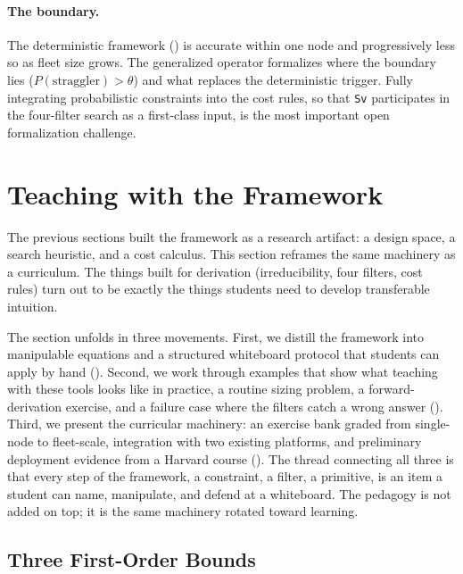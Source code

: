 \documentclass[10pt,twocolumn]{article}
\begin{document}
\paragraph{The boundary.} The deterministic framework () is accurate within one node and progressively less so as fleet size grows. The generalized operator formalizes where the boundary lies ($P(\text{straggler}) > \theta$) and what replaces the deterministic trigger. Fully integrating probabilistic constraints into the cost rules, so that \texttt{Sv} participates in the four-filter search as a first-class input, is the most important open formalization challenge.

\section{Teaching with the Framework}
\label{sec:teaching}

The previous sections built the framework as a research artifact: a design space, a search heuristic, and a cost calculus. This section reframes the same machinery as a curriculum. The things built for derivation (irreducibility, four filters, cost rules) turn out to be exactly the things students need to develop transferable intuition.

The section unfolds in three movements. First, we distill the framework into manipulable equations and a structured whiteboard protocol that students can apply by hand (). Second, we work through examples that show what teaching with these tools looks like in practice, a routine sizing problem, a forward-derivation exercise, and a failure case where the filters catch a wrong answer (). Third, we present the curricular machinery: an exercise bank graded from single-node to fleet-scale, integration with two existing platforms, and preliminary deployment evidence from a Harvard course (). The thread connecting all three is that every step of the framework, a constraint, a filter, a primitive, is an item a student can name, manipulate, and defend at a whiteboard. The pedagogy is not added on top; it is the same machinery rotated toward learning.

\subsection{Three First-Order Bounds}
\label{sec:iron-laws}
\end{document}
